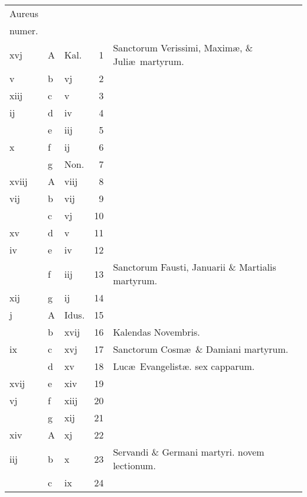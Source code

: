 \documentclass[letter,11pt]{book}
\begin{document}
\begin{center}
\begin{tabular}{l | l | l | r | l}
\color{Red}Aureus & & & \\
\color{Red}numer. & & & \\
\color{Red} xvj & \color{Red} A & \color{Red} Kal. & 1 & Sanctorum Verissimi, Maxim\ae , \& Juli\ae \ martyrum. \\
\color{Red} v & b & \color{Red} vj & 2 & \\
\color{Red} xiij & c & \color{Red} v & 3 & \\
\color{Red} ij & d & \color{Red} iv & 4 & \\
\color{Red}  & e & \color{Red} iij & 5 & \\
\color{Red} x & f & \color{Red} ij & 6 & \\
\color{Red}  & g & Non. & 7 & \\
\color{Red} xviij & \color{Red} A & \color{Red} viij & 8 & \\
\color{Red} vij & b & \color{Red} vij & 9 & \\
\color{Red}  & c & \color{Red} vj & 10 & \\
\color{Red} xv & d & \color{Red} v & 11 & \\
\color{Red} iv & e & \color{Red} iv & 12 & \\
\color{Red}  & f & \color{Red} iij & 13 & Sanctorum Fausti, Januarii \& Martialis martyrum. \\
\color{Red} xij & g & \color{Red} ij & 14 & \\
\color{Red} j & \color{Red} A & Idus. & 15 & \\
\color{Red}  & b & \color{Red} xvij & 16 & \qquad \color{Red} Kalendas Novembris. \\
\color{Red} ix & c & \color{Red} xvj & 17 & Sanctorum Cosm\ae \ \& Damiani martyrum. \\
\color{Red}  & d & \color{Red} xv & 18 & \color{Red} Luc\ae \ Evangelist\ae . \color{black} sex capparum. \\
\color{Red} xvij & e & \color{Red} xiv & 19 & \\
\color{Red} vj & f & \color{Red} xiij & 20 & \\
\color{Red}  & g & \color{Red} xij & 21 & \\
\color{Red} xiv & \color{Red} A & \color{Red} xj & 22 & \\
\color{Red} iij & b & \color{Red} x & 23 & Servandi \& Germani martyri. \color{Red} novem lectionum. \\
\color{Red}  & c & \color{Red} ix & 24 & \\

\end{tabular}
\end{center}
\end{document}
